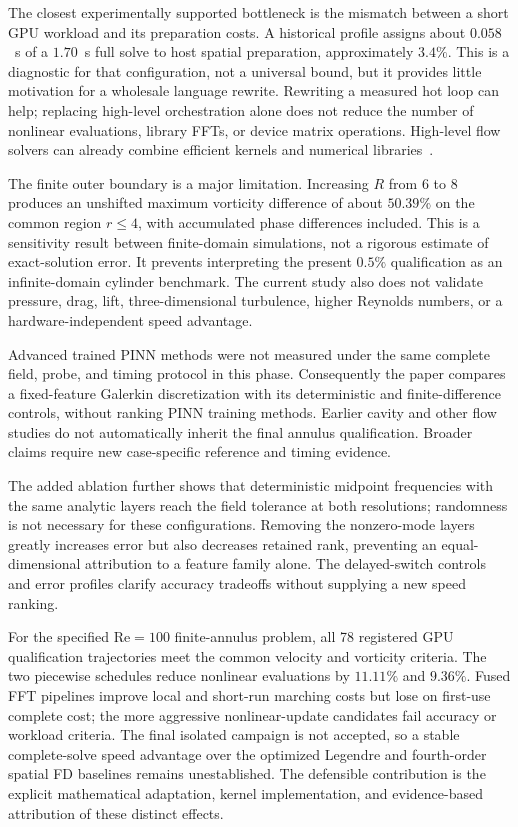 The closest experimentally supported bottleneck is the mismatch between a short GPU workload and its preparation costs. A historical profile assigns about $0.058$~s of a $1.70$~s full solve to host spatial preparation, approximately $3.4\%$. This is a diagnostic for that configuration, not a universal bound, but it provides little motivation for a wholesale language rewrite. Rewriting a measured hot loop can help; replacing high-level orchestration alone does not reduce the number of nonlinear evaluations, library FFTs, or device matrix operations. High-level flow solvers can already combine efficient kernels and numerical libraries~\cite{r14}.

The finite outer boundary is a major limitation. Increasing $R$ from 6 to 8 produces an unshifted maximum vorticity difference of about $50.39\%$ on the common region $r\leq4$, with accumulated phase differences included. This is a sensitivity result between finite-domain simulations, not a rigorous estimate of exact-solution error. It prevents interpreting the present $0.5\%$ qualification as an infinite-domain cylinder benchmark. The current study also does not validate pressure, drag, lift, three-dimensional turbulence, higher Reynolds numbers, or a hardware-independent speed advantage.

Advanced trained PINN methods were not measured under the same complete field, probe, and timing protocol in this phase. Consequently the paper compares a fixed-feature Galerkin discretization with its deterministic and finite-difference controls, without ranking PINN training methods. Earlier cavity and other flow studies do not automatically inherit the final annulus qualification. Broader claims require new case-specific reference and timing evidence.

The added ablation further shows that deterministic midpoint frequencies with the same analytic layers reach the field tolerance at both resolutions; randomness is not necessary for these configurations. Removing the nonzero-mode layers greatly increases error but also decreases retained rank, preventing an equal-dimensional attribution to a feature family alone. The delayed-switch controls and error profiles clarify accuracy tradeoffs without supplying a new speed ranking.

\label{sec:conclusion}
For the specified $\mathrm{Re}=100$ finite-annulus problem, all 78 registered GPU qualification trajectories meet the common velocity and vorticity criteria. The two piecewise schedules reduce nonlinear evaluations by $11.11\%$ and $9.36\%$. Fused FFT pipelines improve local and short-run marching costs but lose on first-use complete cost; the more aggressive nonlinear-update candidates fail accuracy or workload criteria. The final isolated campaign is not accepted, so a stable complete-solve speed advantage over the optimized Legendre and fourth-order spatial FD baselines remains unestablished. The defensible contribution is the explicit mathematical adaptation, kernel implementation, and evidence-based attribution of these distinct effects.


